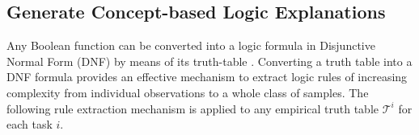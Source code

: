 \subsection{Generate Concept-based Logic Explanations}
Any Boolean function can be converted into a logic formula in Disjunctive Normal Form (DNF) by means of its truth-table \citep{mendelson2009introduction}. 
Converting a truth table into a DNF formula provides an effective mechanism to extract logic rules of increasing complexity from individual observations
to a whole class of samples. 
The following rule extraction mechanism is applied to any empirical truth table $\mathcal{T}^i$ for each task $i$.

